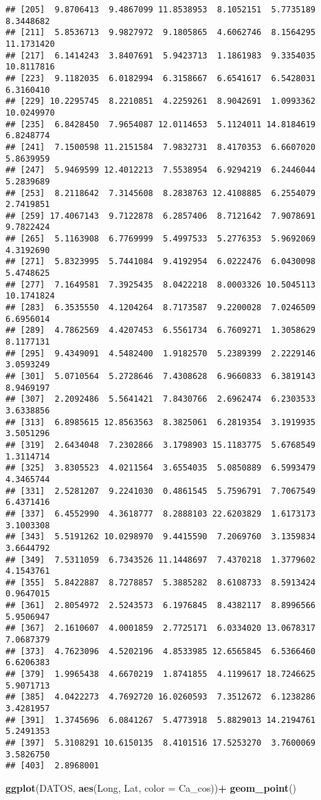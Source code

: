 \documentclass[
]{article}
\newenvironment{Shaded}{\begin{snugshade}}{\end{snugshade}}
\newcommand{\DataTypeTok}[1]{\textcolor[rgb]{0.13,0.29,0.53}{#1}}
\newcommand{\KeywordTok}[1]{\textcolor[rgb]{0.13,0.29,0.53}{\textbf{#1}}}
\newcommand{\NormalTok}[1]{#1}
\newcommand{\OperatorTok}[1]{\textcolor[rgb]{0.81,0.36,0.00}{\textbf{#1}}}
\newcommand{\StringTok}[1]{\textcolor[rgb]{0.31,0.60,0.02}{#1}}
\begin{document}
\begin{verbatim}
## [205]  9.8706413  9.4867099 11.8538953  8.1052151  5.7735189  8.3448682
## [211]  5.8536713  9.9827972  9.1805865  4.6062746  8.1564295 11.1731420
## [217]  6.1414243  3.8407691  5.9423713  1.1861983  9.3354035 10.8117816
## [223]  9.1182035  6.0182994  6.3158667  6.6541617  6.5428031  6.3160410
## [229] 10.2295745  8.2210851  4.2259261  8.9042691  1.0993362 10.0249970
## [235]  6.8428450  7.9654087 12.0114653  5.1124011 14.8184619  6.8248774
## [241]  7.1500598 11.2151584  7.9832731  8.4170353  6.6607020  5.8639959
## [247]  5.9469599 12.4012213  7.5538954  6.9294219  6.2446044  5.2839689
## [253]  8.2118642  7.3145608  8.2838763 12.4108885  6.2554079  2.7419851
## [259] 17.4067143  9.7122878  6.2857406  8.7121642  7.9078691  9.7822424
## [265]  5.1163908  6.7769999  5.4997533  5.2776353  5.9692069  4.3192690
## [271]  5.8323995  5.7441084  9.4192954  6.0222476  6.0430098  5.4748625
## [277]  7.1649581  7.3925435  8.0422218  8.0003326 10.5045113 10.1741824
## [283]  6.3535550  4.1204264  8.7173587  9.2200028  7.0246509  6.6956014
## [289]  4.7862569  4.4207453  6.5561734  6.7609271  1.3058629  8.1177131
## [295]  9.4349091  4.5482400  1.9182570  5.2389399  2.2229146  3.0593249
## [301]  5.0710564  5.2728646  7.4308628  6.9660833  6.3819143  8.9469197
## [307]  2.2092486  5.5641421  7.8430766  2.6962474  6.2303533  3.6338856
## [313]  6.8985615 12.8563563  8.3825061  6.2819354  3.1919935  3.5051296
## [319]  2.6434048  7.2302866  3.1798903 15.1183775  5.6768549  1.3114714
## [325]  3.8305523  4.0211564  3.6554035  5.0850889  6.5993479  4.3465744
## [331]  2.5281207  9.2241030  0.4861545  5.7596791  7.7067549  6.4371416
## [337]  6.4552990  4.3618777  8.2888103 22.6203829  1.6173173  3.1003308
## [343]  5.5191262 10.0298970  9.4415590  7.2069760  3.1359834  3.6644792
## [349]  7.5311059  6.7343526 11.1448697  7.4370218  1.3779602  4.1543761
## [355]  5.8422887  8.7278857  5.3885282  8.6108733  8.5913424  0.9647015
## [361]  2.8054972  2.5243573  6.1976845  8.4382117  8.8996566  5.9506947
## [367]  2.1610607  4.0001859  2.7725171  6.0334020 13.0678317  7.0687379
## [373]  4.7623096  4.5202196  4.8533985 12.6565845  6.5366460  6.6206383
## [379]  1.9965438  4.6670219  1.8741855  4.1199617 18.7246625  5.9071713
## [385]  4.0422273  4.7692720 16.0260593  7.3512672  6.1238286  3.4281957
## [391]  1.3745696  6.0841267  5.4773918  5.8829013 14.2194761  5.2491353
## [397]  5.3108291 10.6150135  8.4101516 17.5253270  3.7600069  3.5826750
## [403]  2.8968001
\end{verbatim}

\begin{Shaded}
\begin{Highlighting}[]
\KeywordTok{ggplot}\NormalTok{(DATOS, }\KeywordTok{aes}\NormalTok{(Long, Lat, }\DataTypeTok{color =}\NormalTok{ Ca_cos))}\OperatorTok{+}
\StringTok{  }\KeywordTok{geom_point}\NormalTok{()}
\end{Highlighting}
\end{Shaded}
\end{document}
